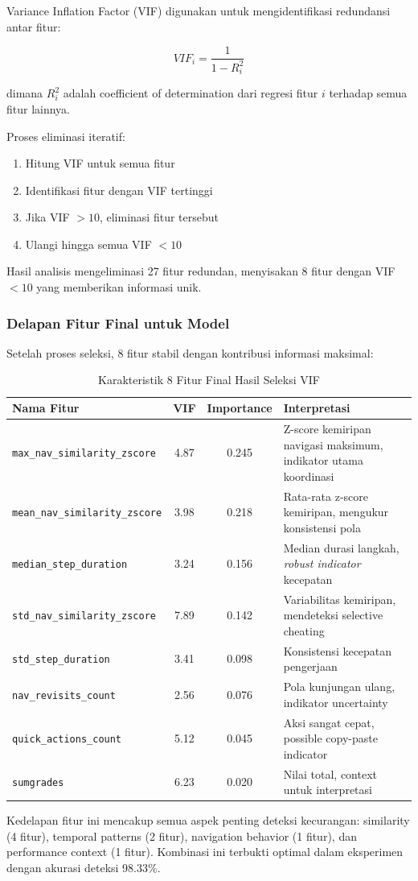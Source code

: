 Variance Inflation Factor (VIF) digunakan untuk mengidentifikasi redundansi antar fitur:

\begin{equation}
VIF_i = \frac{1}{1-R_i^2}
\end{equation}

dimana $R_i^2$ adalah coefficient of determination dari regresi fitur $i$ terhadap semua fitur lainnya.

Proses eliminasi iteratif:
\begin{enumerate}
    \item Hitung VIF untuk semua fitur
    \item Identifikasi fitur dengan VIF tertinggi
    \item Jika VIF $> 10$, eliminasi fitur tersebut
    \item Ulangi hingga semua VIF $< 10$
\end{enumerate}

Hasil analisis mengeliminasi 27 fitur redundan, menyisakan 8 fitur dengan VIF $<10$ yang memberikan informasi unik.

\subsubsection{Delapan Fitur Final untuk Model}
\label{sec:fiturFinal}

Setelah proses seleksi, 8 fitur stabil dengan kontribusi informasi maksimal:

\begin{table}[htbp]
\centering
\caption{Karakteristik 8 Fitur Final Hasil Seleksi VIF}
\label{tabel:fiturFinalKarakteristik}
\begin{tabular}{|p{5cm}|c|c|p{5cm}|}
\hline
\textbf{Nama Fitur} & \textbf{VIF} & \textbf{Importance} & \textbf{Interpretasi} \\
\hline
\texttt{max\_nav\_similarity\_zscore} & 4.87 & 0.245 & Z-score kemiripan navigasi maksimum, indikator utama koordinasi \\
\hline
\texttt{mean\_nav\_similarity\_zscore} & 3.98 & 0.218 & Rata-rata z-score kemiripan, mengukur konsistensi pola \\
\hline
\texttt{median\_step\_duration} & 3.24 & 0.156 & Median durasi langkah, \textit{robust indicator} kecepatan \\
\hline
\texttt{std\_nav\_similarity\_zscore} & 7.89 & 0.142 & Variabilitas kemiripan, mendeteksi selective cheating \\
\hline
\texttt{std\_step\_duration} & 3.41 & 0.098 & Konsistensi kecepatan pengerjaan \\
\hline
\texttt{nav\_revisits\_count} & 2.56 & 0.076 & Pola kunjungan ulang, indikator uncertainty \\
\hline
\texttt{quick\_actions\_count} & 5.12 & 0.045 & Aksi sangat cepat, possible copy-paste indicator \\
\hline
\texttt{sumgrades} & 6.23 & 0.020 & Nilai total, context untuk interpretasi \\
\hline
\end{tabular}
\end{table}

Kedelapan fitur ini mencakup semua aspek penting deteksi kecurangan: similarity (4 fitur), temporal patterns (2 fitur), navigation behavior (1 fitur), dan performance context (1 fitur). Kombinasi ini terbukti optimal dalam eksperimen dengan akurasi deteksi 98.33\%.
